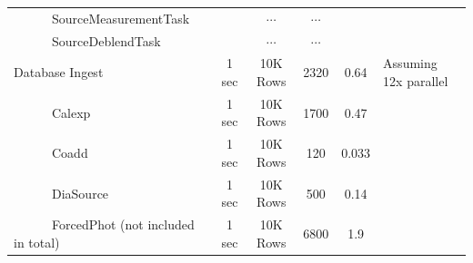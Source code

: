 \documentclass[prd, nofootinbib, floatfix, 11pt,tightenlines,times]{article}
\begin{document}
\begin{table}
\begin{center}
\begin{tabular}{lccccl}
~~~~~~SourceMeasurementTask   &               & $\cdots$     & $\cdots$        &        &  \\
~~~~~~SourceDeblendTask       &               & $\cdots$     & $\cdots$        &        &  \\
\hline
Database Ingest               & 1 sec      & 10K Rows     & 2320     & 0.64    & Assuming 12x parallel  \\
~~~~~~Calexp                  & 1 sec      & 10K Rows     & 1700     & 0.47    &  \\
~~~~~~Coadd                   & 1 sec      & 10K Rows     & 120      & 0.033   &  \\
~~~~~~DiaSource               & 1 sec      & 10K Rows     & 500      & 0.14    &  \\
~~~~~~ForcedPhot (not included in total)& 1 sec      & 10K Rows     & 6800     & 1.9    &  \\
\hline
\hline
\end{tabular}
\end{center}
\end{table}
\end{document}
